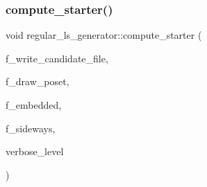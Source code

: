 \mbox{\label{classregular__ls__generator_aa38907741058694a73194b02ceb4a53d}} 
\subsubsection{\texorpdfstring{compute\+\_\+starter()}{compute\_starter()}}
{\footnotesize\ttfamily void regular\+\_\+ls\+\_\+generator\+::compute\+\_\+starter (\begin{DoxyParamCaption}\item[{\mbox{\hyperlink{galois_8h_a09fddde158a3a20bd2dcadb609de11dc}{I\+NT}}}]{f\+\_\+write\+\_\+candidate\+\_\+file,  }\item[{\mbox{\hyperlink{galois_8h_a09fddde158a3a20bd2dcadb609de11dc}{I\+NT}}}]{f\+\_\+draw\+\_\+poset,  }\item[{\mbox{\hyperlink{galois_8h_a09fddde158a3a20bd2dcadb609de11dc}{I\+NT}}}]{f\+\_\+embedded,  }\item[{\mbox{\hyperlink{galois_8h_a09fddde158a3a20bd2dcadb609de11dc}{I\+NT}}}]{f\+\_\+sideways,  }\item[{\mbox{\hyperlink{galois_8h_a09fddde158a3a20bd2dcadb609de11dc}{I\+NT}}}]{verbose\+\_\+level }\end{DoxyParamCaption})}

\mbox{\label{classregular__ls__generator_ab657f1b183fe45c4dd6e51bf0d21280a}} 
